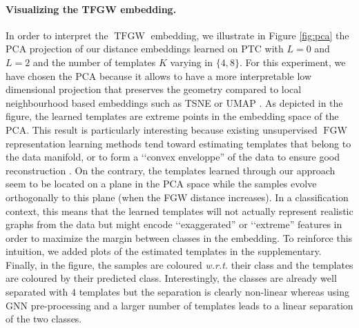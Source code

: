 \documentclass{article}
\newcommand{\FGW}{\operatorname{FGW}}
\newcommand{\TFGW}{\operatorname{TFGW}}
\begin{document}
\paragraph{Visualizing the TFGW embedding.}{
In order to interpret the $\TFGW$ embedding, we illustrate in Figure
\ref{fig:pca} the PCA projection of our distance embeddings learned on
PTC with $L=0$ and $L=2$ and the number of templates $K$ varying in $\{4,8\}$. {For this experiment, we have chosen the PCA because it allows to have 
a more interpretable low dimensional projection that preserves the geometry compared to local 
neighbourhood based embeddings such as TSNE \cite{van2008visualizing} or UMAP
\cite{mcinnes2018umap}. As depicted in the figure, the learned templates are extreme
points in the embedding space of the PCA. This result is particularly interesting because existing unsupervised $\FGW$ representation learning methods
tend toward estimating templates that belong to the data manifold, or to form a
‘‘convex enveloppe'' of the data to ensure good reconstruction \cite{vincent2021online,xu2020gromov}. On the contrary, the templates learned through our approach seem to be located on a plane in the PCA space while the samples evolve orthogonally to this plane (when the FGW distance increases).
In a classification context, this means that the learned templates will not actually represent realistic graphs from the data
but might encode ‘‘exaggerated'' or ‘‘extreme'' features in order to maximize the margin
between classes in the embedding. To reinforce this intuition, we added plots of the
estimated templates in the supplementary. Finally, in the figure, the samples are coloured \textit{w.r.t.} their class and the templates are coloured by
their predicted class. Interestingly, the classes are already well separated with $4$ templates but the separation is clearly
non-linear whereas using GNN pre-processing and a larger number of templates leads to a linear separation of the two classes.}


}
\end{document}
